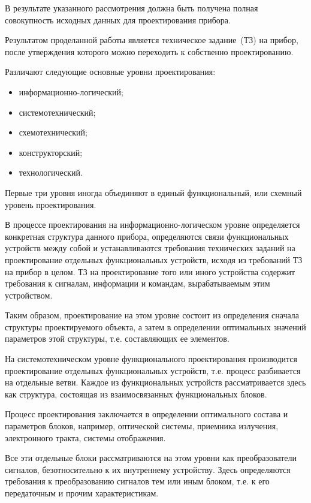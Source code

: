 В результате указанного рассмотрения должна быть получена полная совокупность исходных данных для проектирования прибора. 

Результатом проделанной работы является техническое задание~(ТЗ) на прибор, после утверждения которого можно переходить к собственно проектированию.

Различают следующие основные уровни проектирования:
\begin{itemize}
	\item информационно-логический;
	\item системотехнический;
	\item схемотехнический;
	\item конструкторский;
	\item технологический.
\end{itemize}

Первые три уровня иногда объединяют в единый функциональный, или схемный уровень проектирования.

В процессе проектирования на информационно-логическом уровне определяется конкретная структура данного прибора, определяются связи функциональных устройств между собой и устанавливаются требования технических заданий на проектирование отдельных функциональных устройств, исходя из требований ТЗ на прибор в целом. ТЗ на проектирование того или иного устройства содержит требования к сигналам, информации и командам, вырабатываемым этим устройством.

Таким образом, проектирование на этом уровне состоит из определения сначала структуры проектируемого объекта, а затем в определении оптимальных значений параметров этой структуры, т.е. составляющих ее элементов.

На системотехническом уровне функционального проектирования производится проектирование отдельных функциональных устройств, т.е. процесс разбивается на отдельные ветви. 
Каждое из функциональных устройств рассматривается здесь как структура, состоящая из взаимосвязанных функциональных блоков. 

Процесс проектирования заключается в определении оптимального состава и параметров блоков, например, оптической системы, приемника излучения, электронного тракта, системы отображения.

Все эти отдельные блоки рассматриваются на этом уровни как преобразователи сигналов, безотносительно к их внутреннему устройству. Здесь определяются требования к преобразованию сигналов тем или иным блоком, т.е. к его передаточным и прочим характеристикам.


